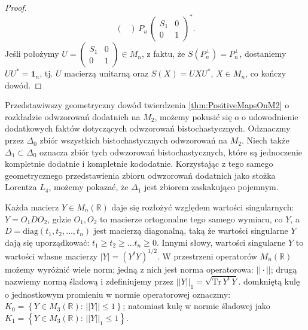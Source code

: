 \begin{proof}
\begin{equation}
\begin{pmatrix}
    \end{pmatrix}
    \, P_{u} \,
    \begin{pmatrix}
    S_{1} & 0 \\ 0 & 1
    \end{pmatrix}^{*}.
\end{equation}
Jeśli położymy $U = \left( \begin{smallmatrix} S_{1} & 0 \\ 0 & 1
\end{smallmatrix} \right) \in M_{n}$,
z faktu, że $S(P_{n}^{\perp}) = P_{n}^{\perp}$,
dostaniemy $U U^{*} = \mathbf{1}_{n}$, tj. $U$ macierzą unitarną oraz
$S(X) = U X U^{*}$, $X \in M_{n}$, co kończy dowód.
\end{proof}

Przedstawiwszy geometryczny dowód twierdzenia \ref{thm:PositiveMapsOnM2}
o rozkładzie odwzorowań dodatnich na $M_{2}$, możemy pokusić się o
o udowodnienie dodatkowych faktów dotyczących odwzorowań bistochastycznych.
Odznaczmy przez $\Delta_{0}$ zbiór wszystkich bistochastycznych odwzorowań na
$M_{2}$.
Niech także $\Delta_{1} \subset \Delta_{0}$ oznacza zbiór tych odwzorowań
bistochastycznych,
które są jednoczenie kompletnie dodatnie i kompletnie kododatnie.
Korzystając z tego samego geometrycznego przedstawienia zbioru
odwzorowań dodatnich jako stożka Lorentza $L_{4}$,
możemy pokazać, że $\Delta_{1}$ jest zbiorem zaskakująco pojemnym.

Każda macierz $Y \in M_{n}(\mathbb{R})$ daje się rozłożyć względem wartości singularnych:
$Y = O_{1} D O_{2}$, gdzie
$O_{1}, O_{2}$ to macierze ortogonalne tego samego wymiaru, co $Y$, a
$D = \text{diag}(t_{1}, t_{2}, \ldots, t_{n})$ jest macierzą diagonalną,
taką że wartości singularne $Y$ dają się uporządkować:
$t_{1} \geq t_{2} \geq \ldots t_{n} \geq 0$.
Innymi słowy, wartości singularne $Y$ to wartości własne macierzy
$|Y| = (Y^{t} Y)^{1/2}$.
W przestrzeni operatorów $M_{n}(\mathbb{R})$ możemy wyróżnić wiele norm;
jedną z nich jest norma operatorowa: $|| \cdot ||$;
drugą nazwiemy normą śladową i zdefiniujemy przez
$||Y||_{1} = \sqrt{\text{Tr} \, Y^{t} \, Y }$.
domkniętą kulę o jednostkowym promieniu w normie operatorowej oznaczmy:
$K_{0} = \left \{ Y \in M_{3}(\mathbb{R}): \, ||Y|| \leq 1 \right \}$;
natomiast kulę w normie śladowej jako
$K_{1} = \left \{ Y \in M_{3}(\mathbb{R}): \, ||Y||_{1} \leq 1 \right \}$.

